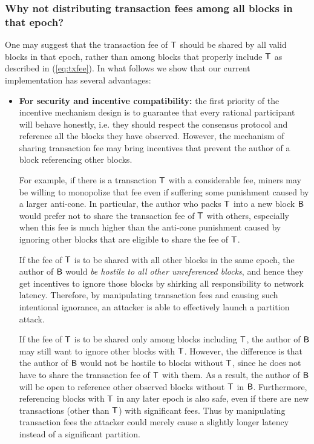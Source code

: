 \subsubsection{Why not distributing transaction fees among all blocks in that epoch?}
	One may suggest that the transaction fee of $\textsf{T}$ should be shared by all valid blocks in that epoch, rather than among blocks that properly include $\textsf{T}$ as described in (\ref{eq:txfee}).
	In what follows we show that our current implementation has several advantages:
	\begin{itemize}
		\item {\bf For security and incentive compatibility:} 
		the first priority of the incentive mechanism design is to guarantee that every rational participant will behave honestly, i.e. they should respect the consensus protocol and reference all the blocks they have observed.
		However, the mechanism of sharing transaction fee may bring incentives that prevent the author of a block referencing other blocks.

		For example, if there is a transaction $\textsf{T}$ with a considerable fee, miners may be willing to monopolize that fee even if suffering some punishment caused by a larger anti-cone.
		In particular, the author who packs $\textsf{T}$ into a new block $\textsf{B}$ would prefer not to share the transaction fee of $\textsf{T}$ with others, especially when this fee is much higher than the anti-cone punishment caused by ignoring other blocks that are eligible to share the fee of $\textsf{T}$.

		If the fee of $\textsf{T}$ is to be shared with all other blocks in the same epoch, the author of $\textsf{B}$ would \emph{be hostile to all other unreferenced blocks}, and hence they get incentives to ignore those blocks by shirking all responsibility to network latency. 
		Therefore, by manipulating transaction fees and causing such intentional ignorance, an attacker is able to effectively launch a partition attack.

		If the fee of $\textsf{T}$ is to be shared only among blocks including $\textsf{T}$, the author of $\textsf{B}$ may still want to ignore other blocks with $\textsf{T}$. 
		However, the difference is that the author of $\textsf{B}$ would not be hostile to blocks without $\textsf{T}$, since he does not have to share the transaction fee of $\textsf{T}$ with them.
		As a result, the author of $\textsf{B}$ will be open to reference other observed blocks without $\textsf{T}$ in $\textsf{B}$.
		Furthermore, referencing blocks with $\textsf{T}$ in any later epoch is also safe, even if there are new transactions (other than $\textsf{T}$) with significant fees.
		Thus by manipulating transaction fees the attacker could merely cause a slightly longer latency instead of a significant partition.


\end{itemize}

